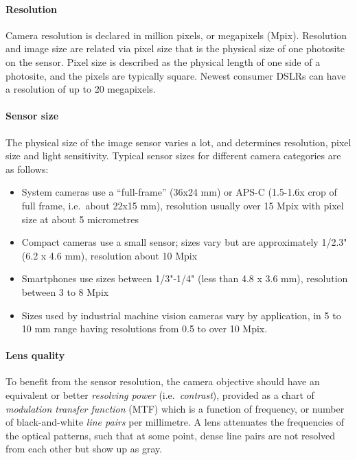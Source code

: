\paragraph{Resolution}
Camera resolution is declared in million pixels, or megapixels (Mpix).
Resolution and image size are related via pixel size that is the physical size of one photosite on the sensor.
Pixel size is described as the physical length of one side of a photosite, and the pixels are typically square.
Newest consumer DSLRs can have a resolution of up to 20 megapixels.


\paragraph{Sensor size}
The physical size of the image sensor varies a lot, and determines resolution, pixel size and light sensitivity.
Typical sensor sizes for different camera categories are as follows:

\begin{itemize}
	\item System cameras use a ``full-frame'' (36x24 mm) or APS-C (1.5-1.6x crop of full frame, i.e.~about 22x15 mm), resolution usually over 15 Mpix with pixel size at about 5 micrometres
	\item Compact cameras use a small sensor; sizes vary but are approximately 1/2.3" (6.2 x 4.6 mm), resolution about 10 Mpix
	\item Smartphones use sizes between 1/3"-1/4" (less than 4.8 x 3.6 mm), resolution between 3 to 8 Mpix
	\item Sizes used by industrial machine vision cameras vary by application, in 5 to 10 mm range having resolutions from 0.5 to over 10 Mpix.
\end{itemize}



\paragraph{Lens quality}
To benefit from the sensor resolution, the camera objective should have an equivalent or better \emph{resolving power} (i.e.\ \emph{contrast}), provided as a chart of \emph{modulation transfer function} (MTF) which is a function of frequency, or number of black-and-white \emph{line pairs} per millimetre.
A lens attenuates the frequencies of the optical patterns, such that at some point, dense line pairs are not resolved from each other but show up as gray.
\cite{nakamura2005image} \cite[p. 71]{kingslake1992optics}

